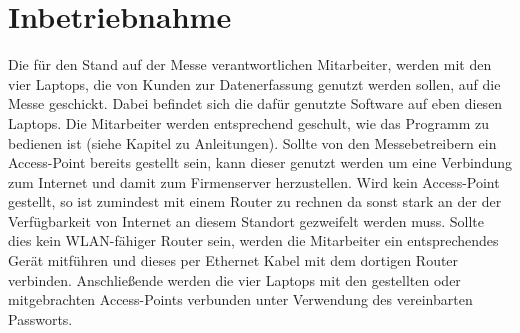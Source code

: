 \section{Inbetriebnahme}
Die für den Stand auf der Messe verantwortlichen Mitarbeiter, werden mit den vier Laptops, die von Kunden zur Datenerfassung genutzt werden sollen, auf die Messe geschickt. Dabei befindet sich die dafür genutzte Software auf eben diesen Laptops. Die Mitarbeiter werden entsprechend geschult, wie das Programm zu bedienen ist (siehe Kapitel zu Anleitungen). Sollte von den Messebetreibern ein Access-Point bereits gestellt sein, kann dieser genutzt werden um eine Verbindung zum Internet und damit zum Firmenserver herzustellen. Wird kein Access-Point gestellt, so ist zumindest mit einem Router zu rechnen da sonst stark an der der Verfügbarkeit von Internet an diesem Standort gezweifelt werden muss. Sollte dies kein WLAN-fähiger Router sein, werden die Mitarbeiter ein entsprechendes Gerät mitführen und dieses per Ethernet Kabel mit dem dortigen Router verbinden. 
Anschließende werden die vier Laptops mit den gestellten oder mitgebrachten Access-Points verbunden unter Verwendung des vereinbarten Passworts.


